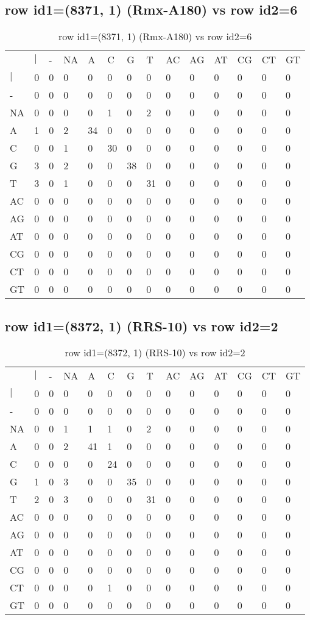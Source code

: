 \subsection{row id1=(8371, 1) (Rmx-A180) vs row id2=6}
\begin{center}
\begin{longtable}{|l|l|l|l|l|l|l|l|l|l|l|l|l|l|}
\caption{row id1=(8371, 1) (Rmx-A180) vs row id2=6} \label{table_dm600}\\
\hline
\\
\hline
&$|$&-&NA&A&C&G&T&AC&AG&AT&CG&CT&GT\\
$|$&0&0&0&0&0&0&0&0&0&0&0&0&0\\
-&0&0&0&0&0&0&0&0&0&0&0&0&0\\
NA&0&0&0&0&1&0&2&0&0&0&0&0&0\\
A&1&0&2&34&0&0&0&0&0&0&0&0&0\\
C&0&0&1&0&30&0&0&0&0&0&0&0&0\\
G&3&0&2&0&0&38&0&0&0&0&0&0&0\\
T&3&0&1&0&0&0&31&0&0&0&0&0&0\\
AC&0&0&0&0&0&0&0&0&0&0&0&0&0\\
AG&0&0&0&0&0&0&0&0&0&0&0&0&0\\
AT&0&0&0&0&0&0&0&0&0&0&0&0&0\\
CG&0&0&0&0&0&0&0&0&0&0&0&0&0\\
CT&0&0&0&0&0&0&0&0&0&0&0&0&0\\
GT&0&0&0&0&0&0&0&0&0&0&0&0&0\\
\hline
\end{longtable}
\end{center}

\subsection{row id1=(8372, 1) (RRS-10) vs row id2=2}
\begin{center}
\begin{longtable}{|l|l|l|l|l|l|l|l|l|l|l|l|l|l|}
\caption{row id1=(8372, 1) (RRS-10) vs row id2=2} \label{table_dm602}\\
\hline
\\
\hline
&$|$&-&NA&A&C&G&T&AC&AG&AT&CG&CT&GT\\
$|$&0&0&0&0&0&0&0&0&0&0&0&0&0\\
-&0&0&0&0&0&0&0&0&0&0&0&0&0\\
NA&0&0&1&1&1&0&2&0&0&0&0&0&0\\
A&0&0&2&41&1&0&0&0&0&0&0&0&0\\
C&0&0&0&0&24&0&0&0&0&0&0&0&0\\
G&1&0&3&0&0&35&0&0&0&0&0&0&0\\
T&2&0&3&0&0&0&31&0&0&0&0&0&0\\
AC&0&0&0&0&0&0&0&0&0&0&0&0&0\\
AG&0&0&0&0&0&0&0&0&0&0&0&0&0\\
AT&0&0&0&0&0&0&0&0&0&0&0&0&0\\
CG&0&0&0&0&0&0&0&0&0&0&0&0&0\\
CT&0&0&0&0&1&0&0&0&0&0&0&0&0\\
GT&0&0&0&0&0&0&0&0&0&0&0&0&0\\
\hline
\end{longtable}
\end{center}

